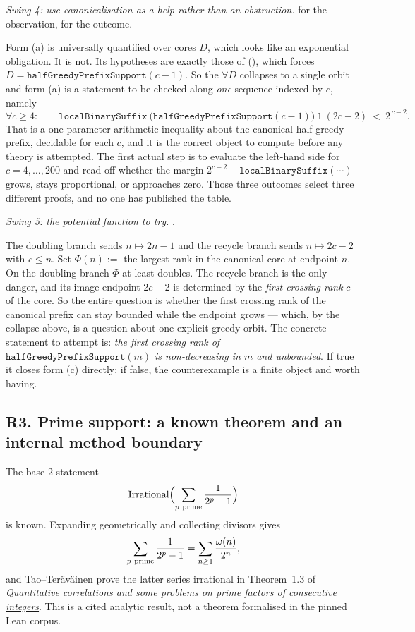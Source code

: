 \emph{Swing 4: use canonicalisation as a help rather than an obstruction.}  for the
observation,  for the outcome.

Form (a) is universally quantified over cores $D$, which looks like an exponential obligation.
It is not. Its hypotheses are exactly those of
(), which forces $D=\mathtt{halfGreedyPrefixSupport}(c-1)$. So the $\forall D$ collapses
to a single orbit and form (a) is a statement to be checked along \emph{one} sequence indexed by
$c$, namely
\[
\forall c\ge 4:\qquad
\mathtt{localBinarySuffix}\ \bigl(\mathtt{halfGreedyPrefixSupport}(c-1)\bigr)\ 1\ (2c-2)\ <\ 2^{\,c-2}.
\]
That is a one-parameter arithmetic inequality about the canonical half-greedy prefix, decidable
for each $c$, and it is the correct object to compute before any theory is attempted. The first
actual step is to evaluate the left-hand side for $c=4,\dots,200$ and read off whether the margin
$2^{c-2}-\mathtt{localBinarySuffix}(\cdots)$ grows, stays proportional, or approaches zero. Those
three outcomes select three different proofs, and no one has published the table.

\emph{Swing 5: the potential function to try.} .

The doubling branch sends $n\mapsto 2n-1$ and the recycle branch sends $n\mapsto 2c-2$ with
$c\le n$. Set $\Phi(n):=$ the largest rank in the canonical core at endpoint $n$. On the doubling
branch $\Phi$ at least doubles. The recycle branch is the only danger, and its image endpoint
$2c-2$ is determined by the \emph{first crossing rank} $c$ of the core. So the entire question is
whether the first crossing rank of the canonical prefix can stay bounded while the endpoint grows
--- which, by the collapse above, is a question about one explicit greedy orbit. The concrete
statement to attempt is: \emph{the first crossing rank of
$\mathtt{halfGreedyPrefixSupport}(m)$ is non-decreasing in $m$ and unbounded}. If true it closes
form (c) directly; if false, the counterexample is a finite object and worth having.

\subsection{R3. Prime support: a known theorem and an internal method boundary}
\label{sec:invent-R3}

The base-$2$ statement
\[
\mathrm{Irrational}\Bigl(\sum_{p\ {\rm prime}}\frac1{2^p-1}\Bigr)
\]
is known.  Expanding geometrically and collecting divisors gives
\[
 \sum_{p\ {\rm prime}}\frac1{2^p-1}
 =\sum_{n\ge1}\frac{\omega(n)}{2^n},
\]
and Tao--Ter\"av\"ainen prove the latter series irrational in Theorem~1.3
of
\href{https://arxiv.org/abs/2512.01739}{\emph{Quantitative correlations and
some problems on prime factors of consecutive integers}}.  This is a cited
analytic result, not a theorem formalised in the pinned Lean corpus.

